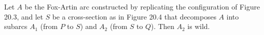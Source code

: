 Let $A$ be the Fox-Artin arc constructed by replicating the configuration of Figure 20.3, and let $S$ be a cross-section as in Figure 20.4 that decomposes $A$ into subarcs $A_1$ (from $P$ to $S$) and $A_2$ (from $S$ to $Q$). Then $A_2$ is wild.
